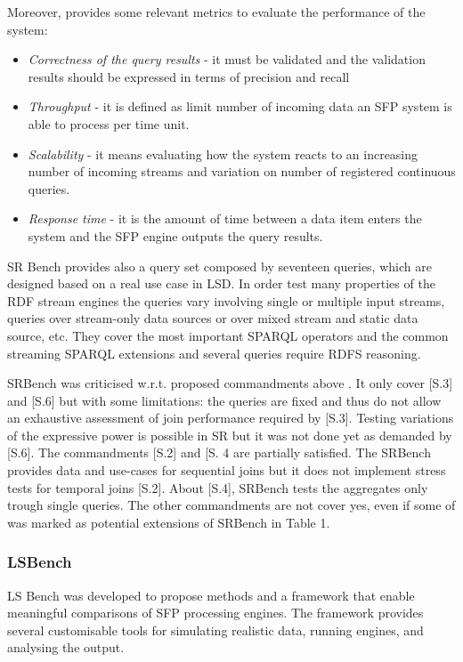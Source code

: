 Moreover, \cite{Zhang2012} provides some relevant metrics to evaluate the performance of the system: 
\begin{itemize}
\item \textit{Correctness of the query results} - it must be validated and the validation results should be expressed in terms of precision and recall
\item \textit{Throughput} - it is defined as limit number of incoming data an SFP system is able to process per time unit.
\item \textit{Scalability} - it means evaluating how the system reacts to an increasing number of incoming streams and variation on number of registered continuous queries.
\item \textit{Response time} - it is the amount of time between a data item enters the system and the SFP engine outputs the query results.
\end{itemize}

SR Bench provides also a query set composed by seventeen queries, which are designed based on a real use case in LSD. In order test many properties of the RDF stream engines the queries vary involving single or multiple input streams, queries over stream-only data sources or over mixed stream and static data source, etc. They cover the most important SPARQL operators and the common streaming SPARQL extensions and several queries require RDFS reasoning.

SRBench was criticised w.r.t. proposed commandments above \cite{DBLP:conf/esws/ScharrenbachUMVB13}. It only cover [S.3] and [S.6] but with some limitations: the queries are fixed and thus do not allow an exhaustive assessment of join performance required by [S.3]. Testing variations of the expressive power is possible in SR but it was not done yet as demanded by [S.6]. The commandments [S.2] and [S.
4 are partially satisfied. The SRBench provides data and use-cases for sequential joins but it does not implement stress tests for temporal joins [S.2]. About [S.4], SRBench tests the aggregates only trough single queries. The other commandments are not cover yes, even if some of was marked as potential extensions of SRBench in \cite{DBLP:conf/esws/ScharrenbachUMVB13} Table 1.

\subsubsection{LSBench}\label{sec:lsbench}

LS Bench was developed to propose methods and a framework that enable meaningful comparisons of SFP processing engines. The framework provides several customisable tools for simulating realistic data, running engines, and analysing the output. 

